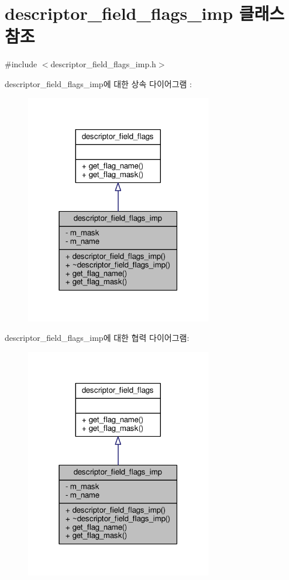 \hypertarget{classavdecc__lib_1_1descriptor__field__flags__imp}{}\section{descriptor\+\_\+field\+\_\+flags\+\_\+imp 클래스 참조}
\label{classavdecc__lib_1_1descriptor__field__flags__imp}


{\ttfamily \#include $<$descriptor\+\_\+field\+\_\+flags\+\_\+imp.\+h$>$}



descriptor\+\_\+field\+\_\+flags\+\_\+imp에 대한 상속 다이어그램 \+: 
\nopagebreak
\begin{figure}[H]
\begin{center}
\leavevmode
\includegraphics[width=231pt]{classavdecc__lib_1_1descriptor__field__flags__imp__inherit__graph}
\end{center}
\end{figure}


descriptor\+\_\+field\+\_\+flags\+\_\+imp에 대한 협력 다이어그램\+:
\nopagebreak
\begin{figure}[H]
\begin{center}
\leavevmode
\includegraphics[width=231pt]{classavdecc__lib_1_1descriptor__field__flags__imp__coll__graph}
\end{center}
\end{figure}
